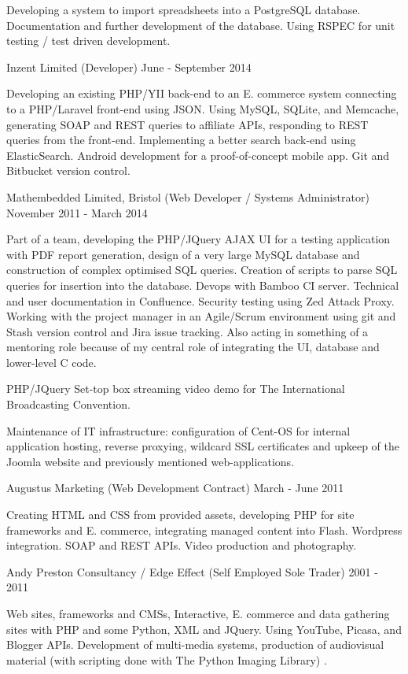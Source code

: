 Developing a 
system to import spreadsheets into a PostgreSQL database.
Documentation and further development of the database.
Using RSPEC for unit testing / test driven development.

\jobHeading
    {Inzent Limited (Developer)}
    {June - September 2014}

Developing an existing PHP/YII back-end to an
E. commerce system connecting to a PHP/Laravel front-end using JSON.
Using MySQL, SQLite, and Memcache,
generating SOAP and REST queries to affiliate APIs,
responding to REST queries from the front-end.
Implementing a better search back-end using ElasticSearch.
Android development for a proof-of-concept mobile app.
Git and Bitbucket version control.

\jobHeading
    {Mathembedded Limited, Bristol (Web Developer / Systems Administrator)}
    {November 2011 - March 2014}

Part of a team, developing the PHP/JQuery AJAX UI
for a testing application with PDF report generation,
design of a very large MySQL database
and construction of complex optimised SQL queries.
Creation of  scripts
to parse SQL queries for insertion into the database.
Devops with Bamboo CI server.
Technical and user documentation in Confluence.
Security testing using Zed Attack Proxy.
Working with the project manager in an Agile/Scrum environment
using git and Stash version control and Jira issue tracking.
Also acting in something of a mentoring role
because of my central role of integrating the UI,
database and lower-level C code.

PHP/JQuery Set-top box streaming video demo for
The International Broadcasting Convention.

Maintenance of IT infrastructure:
configuration of Cent-OS for internal application hosting,
reverse proxying, wildcard SSL certificates
and upkeep of the Joomla website
and previously mentioned web-applications.

\jobHeading
    {Augustus Marketing (Web Development Contract)}
    {March - June 2011}

Creating HTML and CSS from provided assets,
developing PHP for site frameworks and E. commerce,
integrating managed content into Flash.
Wordpress integration.
SOAP and REST APIs.
Video production and photography.

\jobHeading
    {Andy Preston Consultancy / Edge Effect (Self Employed Sole Trader)}
    {2001 - 2011}

Web sites, frameworks and CMSs, Interactive, E. commerce and
data gathering sites with PHP and some Python, XML and JQuery.
Using YouTube, Picasa, and Blogger APIs.
Development of multi-media systems, production of audiovisual
material\ifnum{}
    (with scripting done with The Python Imaging Library)
\fi.

